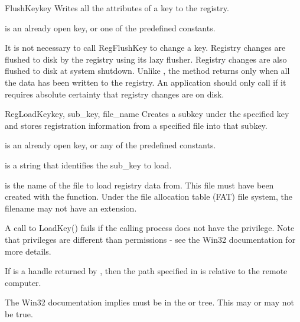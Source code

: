 \begin{funcdesc}{FlushKey}{key}
  Writes all the attributes of a key to the registry.

  is an already open key, or one of the predefined 
  constants.

 It is not necessary to call RegFlushKey to change a key.
 Registry changes are flushed to disk by the registry using its lazy 
 flusher.  Registry changes are also flushed to disk at system 
 shutdown.  Unlike , the  method 
 returns only when all the data has been written to the registry.
 An application should only call  if it requires absolute 
 certainty that registry changes are on disk.
 
 
\end{funcdesc}


\begin{funcdesc}{RegLoadKey}{key, sub_key, file_name}
 Creates a subkey under the specified key and stores registration 
 information from a specified file into that subkey.

  is an already open key, or any of the predefined
  constants.
 
  is a string that identifies the sub_key to load.
 
  is the name of the file to load registry data from.
  This file must have been created with the  function.
  Under the file allocation table (FAT) file system, the filename may not
  have an extension.

 A call to LoadKey() fails if the calling process does not have the
  privilege. Note that privileges
 are different than permissions - see the Win32 documentation for
 more details.

 If  is a handle returned by , 
 then the path specified in  is relative to the 
 remote computer.

 The Win32 documentation implies  must be in the 
  or  tree.
 This may or may not be true.
\end{funcdesc}



